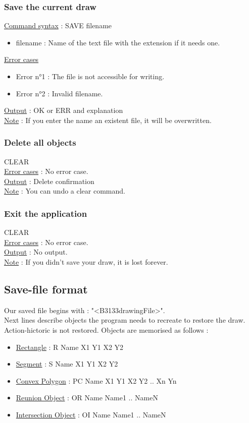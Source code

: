 \documentclass[a4paper, 12pts]{article}
\begin{document}
		\subsubsection{Save the current draw}
			\uline{Command syntax} :
			SAVE filename
			\begin{itemize}
				\item filename : Name of the text file with the extension if it needs one.
			\end{itemize}
			\uline{Error cases}
			\begin{itemize}
				\item Error n°1 : The file is not accessible for writing.
				\item Error n°2 : Invalid filename.
			\end{itemize}
			\uline{Output} : OK or ERR and explanation\\
			\uline{Note} : 
			If you enter the name an existent file, it will be overwritten.

		\subsubsection{Delete all objects}
			CLEAR\\
			\uline{Error cases} : No error case.\\
			\uline{Output} : Delete confirmation\\
			\uline{Note} : 
			You can undo a clear command.

		\subsubsection{Exit the application}
			CLEAR\\
			\uline{Error cases} : No error case.\\
			\uline{Output} : No output.\\
			\uline{Note} : 
			If you didn't save your draw, it is lost forever.

		
	\subsection{Save-file format}
		Our saved file begins with : "<B3133drawingFile>".\\
		Next lines describe objects the program needs to recreate to restore the draw.\\
		Action-hictoric is not restored. Objects are memorised as follows :

		\begin{itemize}
			\item \uline{Rectangle} : R Name X1 Y1 X2 Y2
			\item \uline{Segment} : S Name X1 Y1 X2 Y2
			\item \uline{Convex Polygon} : PC Name X1 Y1 X2 Y2 .. Xn Yn
			\item \uline{Reunion Object} : OR Name Name1 .. NameN
			\item \uline{Intersection Object} : OI Name Name1 .. NameN
		\end{itemize}
\end{document}
